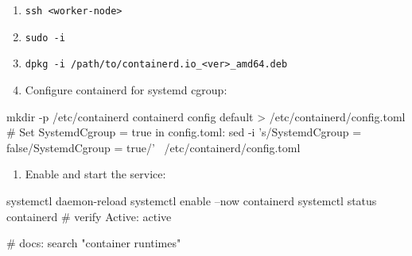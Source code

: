 \begin{tcbitemize}[
  raster columns=3, raster equal height=rows,
  blanker, cheat subtitle
]
\begin{tcbitemize}[
      raster columns=1, raster equal height=rows,
      blanker, cheat subtitle
    ]
      \tcbitem
          {\fontsize{6.5}{7.5}\selectfont\sffamily
          \begin{enumerate}[leftmargin=1.2em, itemsep=0pt, parsep=0pt, topsep=1pt]
            \item \texttt{ssh <worker-node>}
            \item \texttt{sudo -i}
            \item \texttt{dpkg -i /path/to/containerd.io\_<ver>\_amd64.deb}
            \item Configure containerd for systemd cgroup:
          \end{enumerate}}
          \begin{cheatcodebash}
          mkdir -p /etc/containerd
          containerd config default > /etc/containerd/config.toml
          # Set SystemdCgroup = true in config.toml:
          sed -i 's/SystemdCgroup = false/SystemdCgroup = true/' \
            /etc/containerd/config.toml
          \end{cheatcodebash}
          \vspace{-0.5ex}
          {\fontsize{6.5}{7.5}\selectfont\sffamily
          \begin{enumerate}[leftmargin=1.2em, itemsep=0pt, parsep=0pt, topsep=1pt, start=5]
            \item Enable and start the service:
          \end{enumerate}}
          \begin{cheatcodebash}
          systemctl daemon-reload
          systemctl enable --now containerd
          systemctl status containerd   # verify Active: active
          \end{cheatcodebash}
          \vspace{-0.5ex}
          \begin{cheatcodebash}
          # docs: search "container runtimes"
          \end{cheatcodebash}


\end{tcbitemize}
\end{tcbitemize}
